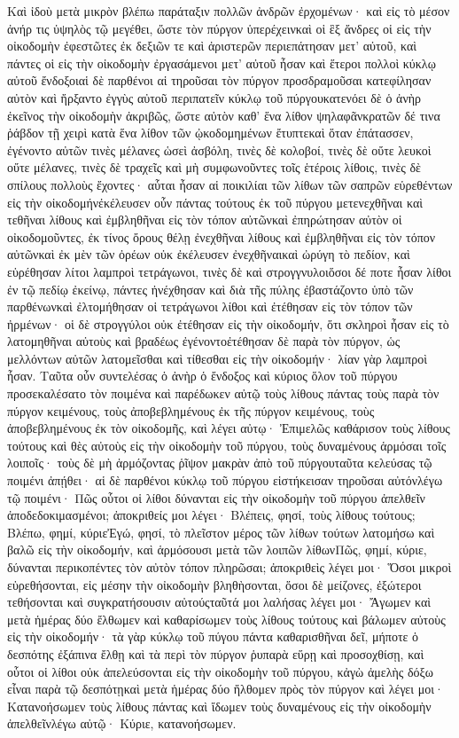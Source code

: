 Καὶ ἰδοὺ μετὰ μικρὸν βλέπω παράταξιν πολλῶν ἀνδρῶν ἐρχομένων· καὶ εἰς τὸ μέσον ἀνήρ τις ὑψηλὸς τῷ μεγέθει, ὥστε τὸν πύργον ὑπερέχεινκαὶ οἱ ἓξ ἄνδρες οἱ εἰς τὴν οἰκοδομὴν ἐφεστῶτες ἐκ δεξιῶν τε καὶ ἀριστερῶν περιεπάτησαν μετ’ αὐτοῦ, καὶ πάντες οἱ εἰς τὴν οἰκοδομὴν ἐργασάμενοι μετ’ αὐτοῦ ἦσαν καὶ ἕτεροι πολλοὶ κύκλῳ αὐτοῦ ἔνδοξοιαἱ δὲ παρθένοι αἱ τηροῦσαι τὸν πύργον προσδραμοῦσαι κατεφίλησαν αὐτὸν καὶ ἤρξαντο ἐγγὺς αὐτοῦ περιπατεῖν κύκλῳ τοῦ πύργουκατενόει δὲ ὁ ἀνὴρ ἐκεῖνος τὴν οἰκοδομὴν ἀκριβῶς, ὥστε αὐτὸν καθ’ ἕνα λίθον ψηλαφᾶνκρατῶν δέ τινα ῥάβδον τῇ χειρὶ κατὰ ἕνα λίθον τῶν ᾠκοδομημένων ἔτυπτεκαὶ ὅταν ἐπάτασσεν, ἐγένοντο αὐτῶν τινὲς μέλανες ὡσεὶ ἀσβόλη, τινὲς δὲ κολοβοί, τινὲς δὲ οὔτε λευκοὶ οὔτε μέλανες, τινὲς δὲ τραχεῖς καὶ μὴ συμφωνοῦντες τοῖς ἑτέροις λίθοις, τινὲς δὲ σπίλους πολλοὺς ἔχοντες· αὗται ἦσαν αἱ ποικιλίαι τῶν λίθων τῶν σαπρῶν εὑρεθέντων εἰς τὴν οἰκοδομήνἐκέλευσεν οὖν πάντας τούτους ἐκ τοῦ πύργου μετενεχθῆναι καὶ τεθῆναι λίθους καὶ ἐμβληθῆναι εἰς τὸν τόπον αὐτῶνκαὶ ἐπηρώτησαν αὐτὸν οἱ οἰκοδομοῦντες, ἐκ τίνος ὄρους θέλῃ ἐνεχθῆναι λίθους καὶ ἐμβληθῆναι εἰς τὸν τόπον αὐτῶνκαὶ ἐκ μὲν τῶν ὀρέων οὐκ ἐκέλευσεν ἐνεχθῆναικαὶ ὠρύγη τὸ πεδίον, καὶ εὑρέθησαν λίτοι λαμπροὶ τετράγωνοι, τινὲς δὲ καὶ στρογγνυλοιὅσοι δέ ποτε ἦσαν λίθοι ἐν τῷ πεδίῳ ἐκείνῳ, πάντες ἠνέχθησαν καὶ διὰ τῆς πύλης ἐβαστάζοντο ὑπὸ τῶν παρθένωνκαὶ ἐλτομήθησαν οἱ τετράγωνοι λίθοι καὶ ἐτέθησαν εἰς τὸν τόπον τῶν ἠρμένων· οἱ δὲ στρογγύλοι οὐκ ἐτέθησαν εἰς τὴν οἰκοδομήν, ὅτι σκληροὶ ἦσαν εἰς τὸ λατομηθῆναι αὐτοὺς καὶ βραδέως ἐγένοντοἐτέθησαν δὲ παρὰ τὸν πύργον, ὡς μελλόντων αὐτῶν λατομεῖσθαι καὶ τίθεσθαι εἰς τὴν οἰκοδομήν· λίαν γὰρ λαμπροὶ ἦσαν.
Ταῦτα οὖν συντελέσας ὁ ἀνὴρ ὁ ἔνδοξος καὶ κύριος ὅλον τοῦ πύργου προσεκαλέσατο τὸν ποιμένα καὶ παρέδωκεν αὐτῷ τοὺς λίθους πάντας τοὺς παρὰ τὸν πύργον κειμένους, τοὺς ἀποβεβλημένους ἐκ τῆς πύργον κειμένους, τοὺς ἀποβεβλημένους ἐκ τὸν οἰκοδομῆς, καὶ λέγει αὐτῳ· Ἐπιμελῶς καθάρισον τοὺς λίθους τούτους καὶ θὲς αὐτοὺς εἰς τὴν οἰκοδομὴν τοῦ πύργου, τοὺς δυναμένους ἁρμόσαι τοῖς λοιποῖς· τοὺς δὲ μὴ ἁρμόζοντας ῥῖψον μακρὰν ἀπὸ τοῦ πύργουταῦτα κελεύσας τῷ ποιμένι ἀπῄθει· αἱ δὲ παρθένοι κύκλῳ τοῦ πύργου εἱστήκεισαν τηροῦσαι αὐτόνλέγω τῷ ποιμένι· Πῶς οὗτοι οἱ λίθοι δύνανται εἰς τὴν οἰκοδομὴν τοῦ πύργου ἀπελθεῖν ἀποδεδοκιμασμένοι; ἀποκριθείς μοι λέγει· Βλέπεις, φησί, τοὺς λίθους τούτους; Βλέπω, φημί, κύριεἘγώ, φησί, τὸ πλεῖστον μέρος τῶν λίθων τούτων λατομήσω καὶ βαλῶ εἰς τὴν οἰκοδομήν, καὶ ἁρμόσουσι μετὰ τῶν λοιπῶν λίθωνΠῶς, φημί, κύριε, δύνανται περικοπέντες τὸν αὐτὸν τόπον πληρῶσαι; ἀποκριθεὶς λέγει μοι· Ὅσοι μικροὶ εὑρεθήσονται, εἰς μέσην τὴν οἰκοδομὴν βληθὴσονται, ὅσοι δὲ μείζονες, ἐξώτεροι τεθήσονται καὶ συγκρατήσουσιν αὐτούςταῦτά μοι λαλήσας λέγει μοι· Ἄγωμεν καὶ μετὰ ἡμέρας δύο ἔλθωμεν καὶ καθαρίσωμεν τοὺς λίθους τούτους καὶ βάλωμεν αὐτοὺς εἰς τὴν οἰκοδομήν· τὰ γὰρ κύκλῳ τοῦ πύγου πάντα καθαρισθῆναι δεῖ, μήποτε ὁ δεσπότης ἐξάπινα ἔλθῃ καὶ τὰ περὶ τὸν πύργον ῥυπαρὰ εὕρῃ καὶ προσοχθίσῃ, καὶ οὗτοι οἱ λίθοι οὐκ ἀπελεύσονται εἰς τὴν οἰκοδομὴν τοῦ πύργου, κἀγὼ ἀμελὴς δόξω εἶναι παρὰ τῷ δεσπότῃκαὶ μετὰ ἡμέρας δύο ἤλθομεν πρὸς τὸν πύργον καὶ λέγει μοι· Κατανοήσωμεν τοὺς λίθους πάντας καὶ ἴδωμεν τοὺς δυναμένους εἰς τὴν οἰκοδομὴν ἀπελθεῖνλέγω αὐτῷ· Κύριε, κατανοήσωμεν.
